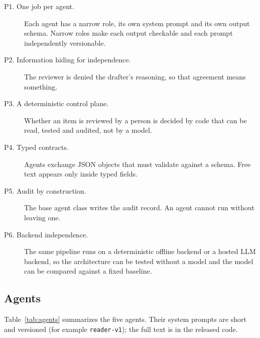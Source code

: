 \documentclass[sigconf,review,anonymous]{acmart}
\begin{document}
\begin{description}
  \item[P1. One job per agent.] Each agent has a narrow role, its own
  system prompt and its own output schema. Narrow roles make each output
  checkable and each prompt independently versionable.
  \item[P2. Information hiding for independence.] The reviewer is denied
  the drafter's reasoning, so that agreement means something.
  \item[P3. A deterministic control plane.] Whether an item is reviewed by a
  person is decided by code that can be read, tested and audited, not by a
  model.
  \item[P4. Typed contracts.] Agents exchange JSON objects that must
  validate against a schema. Free text appears only inside typed fields.
  \item[P5. Audit by construction.] The base agent class writes the audit
  record. An agent cannot run without leaving one.
  \item[P6. Backend independence.] The same pipeline runs on a
  deterministic offline backend or a hosted LLM backend, so the
  architecture can be tested without a model and the model can be compared
  against a fixed baseline.
\end{description}

\subsection{Agents}
\label{sec:agents}

Table~\ref{tab:agents} summarizes the five agents. Their system prompts are
short and versioned (for example \texttt{reader-v1}); the full text is in the
released code.
\end{document}
